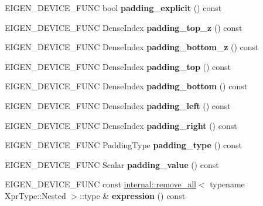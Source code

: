 \begin{DoxyCompactItemize}
E\+I\+G\+E\+N\+\_\+\+D\+E\+V\+I\+C\+E\+\_\+\+F\+U\+NC bool {\bfseries padding\+\_\+explicit} () const
\item 
\mbox{\label{class_eigen_1_1_tensor_volume_patch_op_a98223a5b0475c83295beda5113f08f82}} 
E\+I\+G\+E\+N\+\_\+\+D\+E\+V\+I\+C\+E\+\_\+\+F\+U\+NC Dense\+Index {\bfseries padding\+\_\+top\+\_\+z} () const
\item 
\mbox{\label{class_eigen_1_1_tensor_volume_patch_op_af69e5958efe2d9d3610aee5dc2cd978c}} 
E\+I\+G\+E\+N\+\_\+\+D\+E\+V\+I\+C\+E\+\_\+\+F\+U\+NC Dense\+Index {\bfseries padding\+\_\+bottom\+\_\+z} () const
\item 
\mbox{\label{class_eigen_1_1_tensor_volume_patch_op_a2ab323da058e39ab44b3df4839a20e9e}} 
E\+I\+G\+E\+N\+\_\+\+D\+E\+V\+I\+C\+E\+\_\+\+F\+U\+NC Dense\+Index {\bfseries padding\+\_\+top} () const
\item 
\mbox{\label{class_eigen_1_1_tensor_volume_patch_op_aacfbeea312c868ff6da371751e0ec110}} 
E\+I\+G\+E\+N\+\_\+\+D\+E\+V\+I\+C\+E\+\_\+\+F\+U\+NC Dense\+Index {\bfseries padding\+\_\+bottom} () const
\item 
\mbox{\label{class_eigen_1_1_tensor_volume_patch_op_ad27206fe7f69ae54383b918146e2966f}} 
E\+I\+G\+E\+N\+\_\+\+D\+E\+V\+I\+C\+E\+\_\+\+F\+U\+NC Dense\+Index {\bfseries padding\+\_\+left} () const
\item 
\mbox{\label{class_eigen_1_1_tensor_volume_patch_op_aa8afb8908e6f399a14fc09aaa4108787}} 
E\+I\+G\+E\+N\+\_\+\+D\+E\+V\+I\+C\+E\+\_\+\+F\+U\+NC Dense\+Index {\bfseries padding\+\_\+right} () const
\item 
\mbox{\label{class_eigen_1_1_tensor_volume_patch_op_a654090d3e2dfcf741fb184096b3f58a1}} 
E\+I\+G\+E\+N\+\_\+\+D\+E\+V\+I\+C\+E\+\_\+\+F\+U\+NC Padding\+Type {\bfseries padding\+\_\+type} () const
\item 
\mbox{\label{class_eigen_1_1_tensor_volume_patch_op_af2bc93a4dbbd600e020ff1eda193437e}} 
E\+I\+G\+E\+N\+\_\+\+D\+E\+V\+I\+C\+E\+\_\+\+F\+U\+NC Scalar {\bfseries padding\+\_\+value} () const
\item 
\mbox{\label{class_eigen_1_1_tensor_volume_patch_op_a8934f91a7f998943f051084c80d9f824}} 
E\+I\+G\+E\+N\+\_\+\+D\+E\+V\+I\+C\+E\+\_\+\+F\+U\+NC const \hyperlink{struct_eigen_1_1internal_1_1remove__all}{internal\+::remove\+\_\+all}$<$ typename Xpr\+Type\+::\+Nested $>$\+::type \& {\bfseries expression} () const
\end{DoxyCompactItemize}
